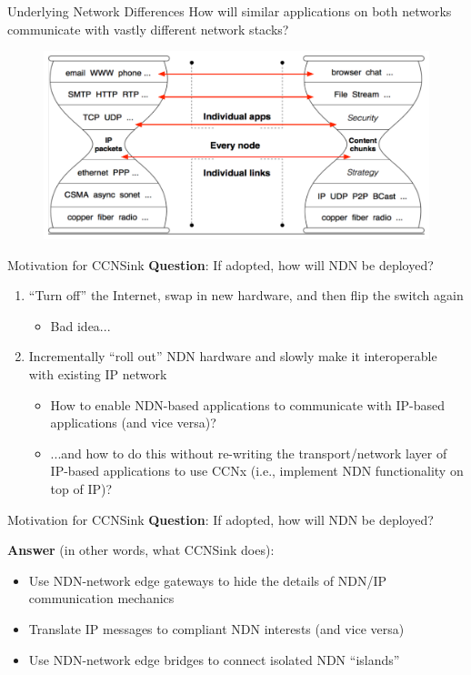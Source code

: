 \documentclass[handout]{beamer}
\begin{document}
\begin{frame}{Underlying Network Differences}
	How will similar applications on both networks communicate with vastly different network stacks?
	\begin{figure}[h]
		\includegraphics[scale=0.32]{./img/hourglass_conn.pdf}
	\end{figure}
\end{frame}

\begin{frame}{Motivation for {\sf CCNSink}}
	\textbf{Question}: If adopted, how will NDN be deployed?
	\begin{enumerate}	
		\item ``Turn off'' the Internet, swap in new hardware, and then flip the switch again
		\begin{itemize}
			\item Bad idea...
		\end{itemize}
		\item Incrementally ``roll out'' NDN hardware and slowly make it interoperable with existing IP network
		\begin{itemize}
			\item How to enable NDN-based applications to communicate with IP-based applications (and vice versa)?
			\item ...and how to do this without re-writing the transport/network layer of IP-based applications to use CCNx (i.e., implement NDN functionality on top of IP)?
		\end{itemize}
	\end{enumerate}
\end{frame}

\begin{frame}{Motivation for {\sf CCNSink}}
	\textbf{Question}: If adopted, how will NDN be deployed?

	\medskip

	{\bf Answer} (in other words, what {\sf CCNSink} does): 
	\begin{itemize}
		\item Use NDN-network edge gateways to hide the details of NDN/IP communication mechanics
		\item Translate IP messages to compliant NDN interests (and vice versa)
		\item Use NDN-network edge bridges to connect isolated NDN ``islands''
	\end{itemize}
\end{frame}
\end{document}
